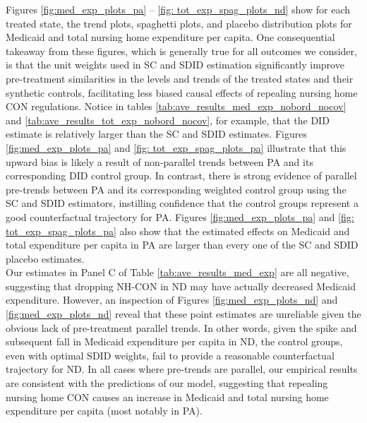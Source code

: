 \documentclass[../Main.tex]{subfiles}
\begin{document}
\indent Figures \ref{fig:med_exp_plots_pa} -- \ref{fig: tot_exp_spag_plots_nd} show for each treated state, the trend plots, spaghetti plots, and placebo distribution plots for Medicaid and total nursing home expenditure per capita. One consequential takeaway from these figures, which is generally true for all outcomes we consider, is that the unit weights used in SC and SDID estimation significantly improve pre-treatment similarities in the levels and trends of the treated states and their synthetic controls, facilitating less biased causal effects of repealing nursing home CON regulations. Notice in tables \ref{tab:ave_results_med_exp_nobord_nocov} and \ref{tab:ave_results_tot_exp_nobord_nocov}, for example, that the DID estimate is relatively larger than the SC and SDID estimates. Figures \ref{fig:med_exp_plots_pa} and \ref{fig: tot_exp_spag_plots_pa} illustrate that this upward bias is likely a result of non-parallel trends between PA and its corresponding DID control group. In contrast, there is strong evidence of parallel pre-trends between PA and its corresponding weighted control group using the SC and SDID estimators, instilling confidence that the control groups represent a good counterfactual trajectory for PA. Figures \ref{fig:med_exp_plots_pa} and \ref{fig: tot_exp_spag_plots_pa} also show that the estimated effects on Medicaid and total expenditure per capita in PA are larger than every one of the SC and SDID placebo estimates.\\
\indent Our estimates in Panel C of Table \ref{tab:ave_results_med_exp} are all negative, suggesting that dropping NH-CON in ND may have actually decreased Medicaid expenditure. However, an inspection of Figures \ref{fig:med_exp_plots_nd} and \ref{fig:med_exp_plots_nd} reveal that these point estimates are unreliable given the obvious lack of pre-treatment parallel trends. In other words, given the spike and subsequent fall in Medicaid expenditure per capita in ND, the control groups, even with optimal SDID weights, fail to provide a reasonable counterfactual trajectory for ND. In all cases where pre-trends are parallel, our empirical results are consistent with the predictions of our model, suggesting that repealing nursing home CON causes an increase in Medicaid and total nursing home expenditure per capita (most notably in PA).
\end{document}
